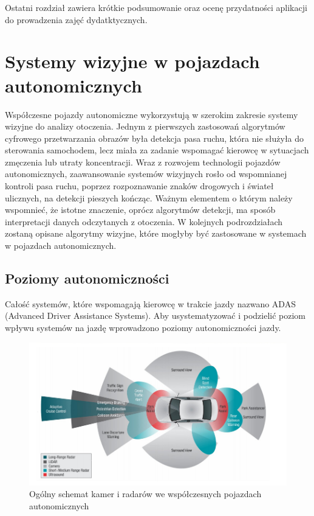 Ostatni rozdział zawiera krótkie podsumowanie oraz ocenę przydatności aplikacji do prowadzenia zajęć dydatktycznych.

\chapter{Systemy wizyjne w pojazdach autonomicznych}
Współczesne pojazdy autonomiczne wykorzystują w szerokim zakresie systemy wizyjne do analizy otoczenia. Jednym z pierwszych zastosowań algorytmów cyfrowego przetwarzania obrazów była detekcja pasa ruchu, która nie służyła do sterowania samochodem, lecz miała za zadanie wspomagać kierowcę w sytuacjach zmęczenia lub utraty koncentracji. Wraz z rozwojem technologii pojazdów autonomicznych, zaawansowanie systemów wizyjnych rosło od wspomnianej kontroli pasa ruchu, poprzez rozpoznawanie znaków drogowych i świateł ulicznych, na detekcji pieszych kończąc. Ważnym elementem o którym należy wspomnieć, że istotne znaczenie, oprócz algorytmów detekcji, ma sposób interpretacji danych odczytanych z otoczenia. W kolejnych podrozdziałach zostaną opisane algorytmy wizyjne, które mogłyby być zastosowane w systemach w pojazdach autonomicznych. 

\section{Poziomy autonomiczności}

Całość systemów, które wspomagają kierowcę w trakcie jazdy nazwano ADAS (Advanced Driver Assistance Systems). Aby usystematyzować  i podzielić poziom wpływu systemów na jazdę wprowadzono poziomy autonomiczności jazdy.

\begin{figure}
  \centering
  \includegraphics[width=13cm]{img/systemy_autonomiczne_ogolnie.png}
  \caption{Ogólny schemat kamer i radarów we współczesnych pojazdach autonomicznych\cite{S1}}
  \label{fig:kamery_i_radary}
\end{figure}

